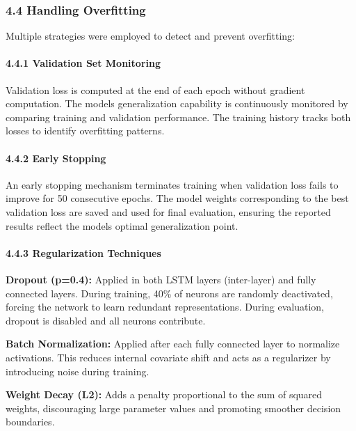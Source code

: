 \documentclass[
]{article}
\begin{document}
\subsubsection{4.4 Handling Overfitting}\label{44-handling-overfitting}

Multiple strategies were employed to detect and prevent overfitting:

\paragraph{4.4.1 Validation Set
Monitoring}\label{441-validation-set-monitoring}

Validation loss is computed at the end of each epoch without gradient
computation. The model\textquotesingle s generalization capability is
continuously monitored by comparing training and validation performance.
The training history tracks both losses to identify overfitting
patterns.

\paragraph{4.4.2 Early Stopping}\label{442-early-stopping}

An early stopping mechanism terminates training when validation loss
fails to improve for 50 consecutive epochs. The model weights
corresponding to the best validation loss are saved and used for final
evaluation, ensuring the reported results reflect the
model\textquotesingle s optimal generalization point.

\paragraph{4.4.3 Regularization
Techniques}\label{443-regularization-techniques}

\textbf{Dropout (p=0.4):} Applied in both LSTM layers (inter-layer) and
fully connected layers. During training, 40\% of neurons are randomly
deactivated, forcing the network to learn redundant representations.
During evaluation, dropout is disabled and all neurons contribute.

\textbf{Batch Normalization:} Applied after each fully connected layer
to normalize activations. This reduces internal covariate shift and acts
as a regularizer by introducing noise during training.

\textbf{Weight Decay (L2):} Adds a penalty proportional to the sum of
squared weights, discouraging large parameter values and promoting
smoother decision boundaries.
\end{document}
